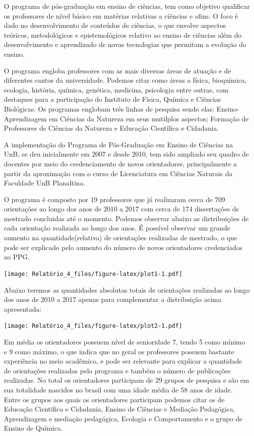 \documentclass[]{article}
\begin{document}
O programa de pós-graduação em ensino de ciências, tem como objetivo
qualificar os professores de nível básico em matérias relativas a
ciências e afins. O foco é dado no desenvolvimento de conteúdos de
ciências, o que envolve aspectos teóricos, metodológicos e
epistemológicos relativo ao ensino de ciências além do desenvolvimento e
aprendizado de novas tecnologias que permitam a evolução do ensino.

O programa engloba professores com as mais diversas áreas de atuação e
de diferentes cantos da universidade. Podemos citar como áreas a física,
bioquímica, ecologia, história, química, genética, medicina, psicologia
entre outras, com destaques para a participação do Instituto de Física,
Química e Ciências Biológicas. Os programas englobam três linhas de
pesquisa sendo elas: Ensino-Aprendizagem em Ciências da Natureza em seus
mutilplos aspectos; Formação de Professores de Ciências da Natureza e
Educação Científica e Cidadania.

A implementação do Programa de Pós-Graduação em Ensino de Ciências na
UnB, se deu inicialmente em 2007 e desde 2010, tem sido ampliado seu
quadro de docentes por meio do credenciamento de novos orientadores,
principalmente a partir da aproximação com o curso de Licenciatura em
Ciências Naturais da Faculdade UnB Planaltina.

O programa é composto por 19 professores que já realizaram cerca de 709
orientações ao longo dos anos de 2010 a 2017 com cerca de 174
dissertações de mestrado concluidas até o momento. Podemos observar
abaixo as distribuições de cada orientação realizada ao longo dos anos.
É possível observar um grande aumento na quantidade(relativa) de
orientações realizadas de mestrado, o que pode ser explicado pelo
aumento do número de novos orientadores credenciados ao PPG.

\texttt{[image: Relatório\_4\_files/figure-latex/plot1-1.pdf]}

Abaixo teremos as quantidades absolutas totais de orientações realizadas
ao longo dos anos de 2010 a 2017 apenas para complementar a distribuição
acima apresentada:

\texttt{[image: Relatório\_4\_files/figure-latex/plot2-1.pdf]}

Em média os orientadores possuem nível de senioridade 7, tendo 5 como
mínimo e 9 como máximo, o que indica que no geral os professores possuem
bastante experiência no meio acadêmico, e pode ser relevante para
explicar a quantidade de orientações realizadas pelo programa e também o
número de publicações realizadas. No total os orientadores participam de
29 grupos de pesquisa e são em sua totalidade nascidos no brasil com uma
idade média de 58 anos de idade. Entre os grupos aos quais os
orientadores participam podemos citar os de Educação Científica e
Cidadania, Ensino de Ciências e Mediação Pedagógica, Aprendizagem e
mediação pedagógica, Ecologia e Comportamento e o grupo de Ensino de
Química.
\end{document}
